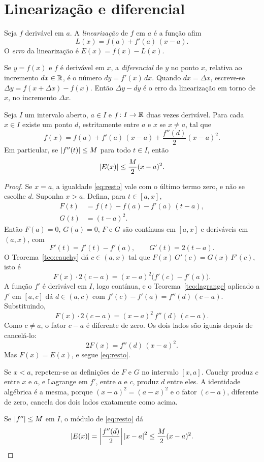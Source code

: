 \documentclass[11pt,a4paper]{article}
\begin{document}
\section{Linearização e diferencial}

\begin{definicao}
Seja $f$ derivável em $a$. A \emph{linearização} de $f$ em $a$ é a função afim
\[
L(x)=f(a)+f'(a)\,(x-a).
\]
O \emph{erro} da linearização é $E(x)=f(x)-L(x)$.

Se $y=f(x)$ e $f$ é derivável em $x$, a \emph{diferencial} de $y$ no ponto $x$, relativa ao incremento $dx\in\mathbb{R}$, é o número $dy=f'(x)\,dx$. Quando $dx=\Delta x$, escreve-se $\Delta y=f(x+\Delta x)-f(x)$. Então $\Delta y-dy$ é o erro da linearização em torno de $x$, no incremento $\Delta x$.
\end{definicao}

\begin{teorema}\label{teo:resto}
Seja $I$ um intervalo aberto, $a\in I$ e $f\colon I\to\mathbb{R}$ duas vezes derivável. Para cada $x\in I$ existe um ponto $d$, estritamente entre $a$ e $x$ se $x\neq a$, tal que
\begin{equation}
\label{eq:resto}
f(x)=f(a)+f'(a)\,(x-a)+\frac{f''(d)}{2}(x-a)^2.
\end{equation}
Em particular, se $\left\lvert f''(t) \right\rvert\le M$ para todo $t\in I$, então
\begin{equation}
\label{eq:erro}
\left\lvert E(x) \right\rvert\le\frac{M}{2}(x-a)^2.
\end{equation}
\end{teorema}

\begin{proof}
Se $x=a$, a igualdade \eqref{eq:resto} vale com o último termo zero, e não se escolhe $d$. Suponha $x>a$. Defina, para $t\in[a,x]$,
\begin{align*}
F(t)&=f(t)-f(a)-f'(a)\,(t-a),\\
G(t)&=(t-a)^2.
\end{align*}
Então $F(a)=0$, $G(a)=0$, $F$ e $G$ são contínuas em $[a,x]$ e deriváveis em $(a,x)$, com
\[
F'(t)=f'(t)-f'(a),\qquad G'(t)=2(t-a).
\]
O Teorema~\ref{teo:cauchy} dá $c\in(a,x)$ tal que $F(x)\,G'(c)=G(x)\,F'(c)$, isto é
\[
F(x)\cdot 2(c-a)=(x-a)^2\bigl(f'(c)-f'(a)\bigr).
\]
A função $f'$ é derivável em $I$, logo contínua, e o Teorema~\ref{teo:lagrange} aplicado a $f'$ em $[a,c]$ dá $d\in(a,c)$ com $f'(c)-f'(a)=f''(d)\,(c-a)$. Substituindo,
\[
F(x)\cdot 2(c-a)=(x-a)^2\,f''(d)\,(c-a).
\]
Como $c\neq a$, o fator $c-a$ é diferente de zero. Os dois lados são iguais depois de cancelá-lo:
\[
2F(x)=f''(d)\,(x-a)^2.
\]
Mas $F(x)=E(x)$, e segue \eqref{eq:resto}.

Se $x<a$, repetem-se as definições de $F$ e $G$ no intervalo $[x,a]$. Cauchy produz $c$ entre $x$ e $a$, e Lagrange em $f'$, entre $a$ e $c$, produz $d$ entre eles. A identidade algébrica é a mesma, porque $(x-a)^2=(a-x)^2$ e o fator $(c-a)$, diferente de zero, cancela dos dois lados exatamente como acima.

Se $\left\lvert f'' \right\rvert\le M$ em $I$, o módulo de \eqref{eq:resto} dá
\[
\left\lvert E(x) \right\rvert=\left\lvert \frac{f''(d)}{2} \right\rvert\left\lvert x-a \right\rvert^2\le\frac{M}{2}(x-a)^2.
\]
\end{proof}
\end{document}
